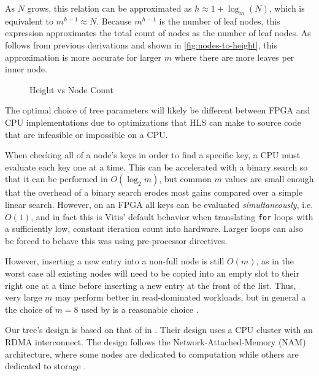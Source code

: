 As $N$ grows, this relation can be approximated as $h \approx 1 + \log_m(N)$,
which is equivalent to  $m^{h-1} \approx N$. Because $m^{h-1}$ is the number of
leaf nodes, this expression approximates the total count of nodes as the number
of leaf nodes. As follows from previous derivations and shown in
\autoref{fig:nodes-to-height}, this approximation is more accurate for larger
$m$ where there are more leaves per inner node.

\begin{figure}[H]
	\centering
	
	\caption{Height vs Node Count}
	\label{fig:nodes-to-height}
\end{figure}



The optimal choice of tree parameters will likely be different between FPGA and
CPU implementations due to optimizations that HLS can make to source code that
are infeasible or impossible on a CPU.

When checking all of a node's keys in order to find a specific key, a CPU must
evaluate each key one at a time. This can be accelerated with a binary search so
that it can be performed in $O(\log_2 m)$, but common $m$ values are small
enough that the overhead of a binary search erodes most gains compared over a
simple linear search.
%
However, on an FPGA all keys can be evaluated \emph{simultaneously}, i.e.
$O(1)$, and in fact this is Vitis' default behavior when translating
\texttt{for} loops with a sufficiently low, constant iteration count into
hardware. Larger loops can also be forced to behave this was using pre-processor
directives.

However, inserting a new entry into a non-full node is still $O(m)$, as in the
worst case all existing nodes will need to be copied into an empty slot to their
right one at a time before inserting a new entry at the front of the list. Thus,
very large $m$ may perform better in read-dominated workloads, but in general a
the choice of $m=8$ used by \citeauthor{ren-fpl-2019} is a reasonable choice
\autocite{ren-fpl-2019}.


\label{subsec:concurrency}

Our tree's design is based on that of \citeauthor{base} in .
Their design uses a CPU cluster with an RDMA interconnect. The design follows
the Network-Attached-Memory (NAM) architecture, where some nodes are dedicated
to computation while others are dedicated to storage
\autocite{base,binnig-vldb-2016}.

